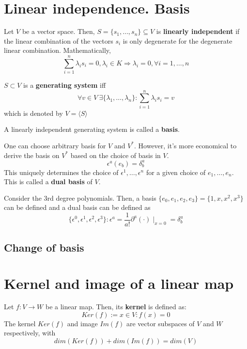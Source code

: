 \documentclass[root.tex]{subfiles}
\begin{document}
  \section{Linear independence. Basis}
  \begin{mydef} 
    Let $V$ be a vector space. Then, $S = \lbrace{s_1, \ldots, s_n \rbrace}\subseteq V$ is \textbf{linearly independent} if the linear combination of the vectors $s_i$ is only degenerate for the degenerate linear combination. Mathematically,
    $$
    \sum_{i=1}^n \lambda_i s_i = 0, \lambda_i \in K \Rightarrow \lambda_i = 0, \forall i = 1, \ldots, n
    $$
  \end{mydef} 
  \begin{mydef}
    $S\subset V$ is a \textbf{generating system} iff
    $$
    \forall v \in V\ \exists \lbrace \lambda_1, \ldots, \lambda_n \rbrace : \sum_{i=1}^n \lambda_i s_i = v
    $$
    which is denoted by $V = \langle S \rangle$
  \end{mydef}
  \begin{mydef}
    A linearly independent generating system is called a \textbf{basis}.
  \end{mydef} 
  \begin{remark}
  One can choose arbitrary basis for $V$ and $V^*$. However, it's more economical to derive the basis on $V^*$ based on the choice of basis in $V$.
  $$
  \epsilon^a(e_b) = \delta^a_b
  $$
  This uniquely determines the choice of $\epsilon^1, \ldots, \epsilon^n$ for a given choice of $e_1, \ldots, e_n$. This is called a \textbf{dual basis} of $V$.
  \end{remark}
  \begin{myex}
    Consider the 3rd degree polynomials. Then, a basis $\{e_0, e_1, e_2, e_3\} = \{1, x, x^2, x^3\}$ can be defined and a dual basis can be defined as  
    $$
    \{\epsilon^0,\epsilon^1,\epsilon^2,\epsilon^3\} : \epsilon^a = \frac{1}{a!}\partial^a (\cdot) \mid_{x=0} = \delta^a_b
    $$
  \end{myex}
  \subsection{Change of basis}

  \section{Kernel and image of a linear map}
  \begin{mydef}
    Let $f:V\rightarrow W$ be a linear map. Then, its \textbf{kernel} is defined as:
    $$
      Ker(f) := x \in V : f(x) = 0
    $$
    The kernel $Ker(f)$ and image $Im(f)$ are vector subspaces of $V$ and $W$ respectively, with
    $$
    dim(Ker(f)) + dim(Im(f)) = dim(V)
    $$
  \end{mydef} 
\end{document}
